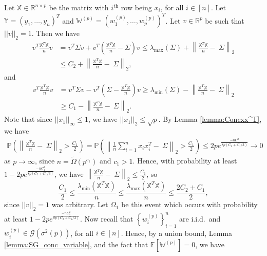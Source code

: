 \documentclass{article}
\newcommand{\iid}{i.i.d.{\ }}
\begin{document}
Let $\mathbb{X} \in \mathbb{R}^{n \times p}$ be the matrix with $i^{\text{th}}$ row being $x_i$, for all $i \in [n]$. Let $\mathbb{Y} = (y_1, \dots, y_n)^T$ and $\mathbb{W}^{(p)} = \left(w_1^{(p)}, \dots, w_p^{(p)}\right)^T$. Let $v \in \mathbb{R}^p$ be such that $||v||_2 = 1$. Then we have
\begin{align*}
v^T\frac{\mathbb{X}^T\mathbb{X}}{n}v &= v^T\Sigma v + v^T\left(\frac{\mathbb{X}^T\mathbb{X}}{n} - \Sigma\right)v \leq \lambda_{\max}\left(\Sigma\right) + \left\|\frac{\mathbb{X}^T\mathbb{X}}{n} - \ \Sigma\right\|_2\\
&\leq C_2 + \left\|\frac{\mathbb{X}^T\mathbb{X}}{n} - \ \Sigma\right\|_2,
\end{align*}
and
\begin{align*}
v^T\frac{\mathbb{X}^T\mathbb{X}}{n}v &= v^T\Sigma v - v^T\left(\Sigma - \frac{\mathbb{X}^T\mathbb{X}}{n}\right)v \geq \lambda_{\min}\left(\Sigma\right) - \left\|\frac{\mathbb{X}^T\mathbb{X}}{n} - \ \Sigma\right\|_2\\
&\geq C_1 - \left\|\frac{\mathbb{X}^T\mathbb{X}}{n} - \ \Sigma\right\|_2.
\end{align*}
Note that since $||x_1||_{\infty} \leq 1$, we have $||x_1||_2 \leq \sqrt{p}$.
By Lemma \ref{lemma:Concxx^T}, we have
\begin{align*}
\mathbb{P}\left(\left\|\frac{\mathbb{X}^T\mathbb{X}}{n} - \ \Sigma\right\|_2 > \frac{C_1}{2}\right) = \mathbb{P}\left(\left\|\frac{1}{n}\sum_{i = 1}^nx_ix_i^T - \ \Sigma\right\|_2 > \frac{C_1}{2}\right) \leq 2pe^{\frac{-nC_1^2}{8p\left(C_2+ C_1/3\right)}} \rightarrow 0
\end{align*}
as $p \rightarrow \infty$, since $n = \widetilde{\Omega}(p^{c_1})$ and $c_1 > 1$. Hence,  with probability at least $1 - 2pe^{\frac{-nC_1^2}{8p\left(C_2+ C_1/3\right)}}$, we have $\left\|\frac{\mathbb{X}^T\mathbb{X}}{n} - \ \Sigma\right\|_2 \leq \frac{C_1}{2}$, so
$$\frac{C_1}{2} \leq \frac{\lambda_{\min}\left(\mathbb{X}^T\mathbb{X}\right)}{n} \leq \frac{\lambda_{\max}\left(\mathbb{X}^T\mathbb{X}\right)}{n} \leq \frac{2C_2 + C_1}{2},$$
since $||v||_2 = 1$ was arbitrary. Let $\Omega_1$ be this event which occurs with probability at least $1 - 2pe^{\frac{-nC_1^2}{8p\left(C_2+ C_1/3\right)}}$. Now recall that $\left\{w_i^{(p)}\right\}_{i = 1}^n$ are \iid and $w_i^{(p)} \in \mathcal{G}\left(\sigma^2(p)\right)$, for all $i \in [n]$. Hence, by a union bound, Lemma \ref{lemma:SG_conc_variable}, and the fact that $\mathbb{E}\left[\mathbb{W}^{(p)}\right] = 0$, we have
\end{document}
